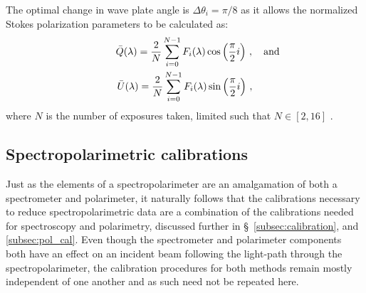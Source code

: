 The optimal change in wave plate angle is $\Delta\theta_{i} = \pi/8$ as it allows the normalized Stokes polarization parameters to be calculated as:
\begin{equation}
    \begin{gathered}
        \bar{Q}(\lambda) = \frac{2}{N} \sum_{i = 0}^{N - 1} F_{i}(\lambda) \cos\left(\frac{\pi}{2} i\right)\,,\rlap{\quad and}\\
        \bar{U}(\lambda) = \frac{2}{N} \sum_{i = 0}^{N - 1} F_{i}(\lambda) \sin\left(\frac{\pi}{2} i\right)\,,
    \end{gathered}\label{eq:specpol_Stokes_sol}
\end{equation}
where $N$ is the number of exposures taken, limited such that $N \in [2, 16]$ \citep{polarimetry_error}.




\subsection{Spectropolarimetric calibrations}\label{subsec:specpol_cal}

Just as the elements of a spectropolarimeter are an amalgamation of both a spectrometer and polarimeter, it naturally follows that the calibrations necessary to reduce spectropolarimetric data are a combination of the calibrations needed for spectroscopy and polarimetry, discussed further in \S~\ref{subsec:calibration}, and \ref{subsec:pol_cal}. Even though the spectrometer and polarimeter components both have an effect on an incident beam following the light-path through the spectropolarimeter, the calibration procedures for both methods remain mostly independent of one another and as such need not be repeated here.

